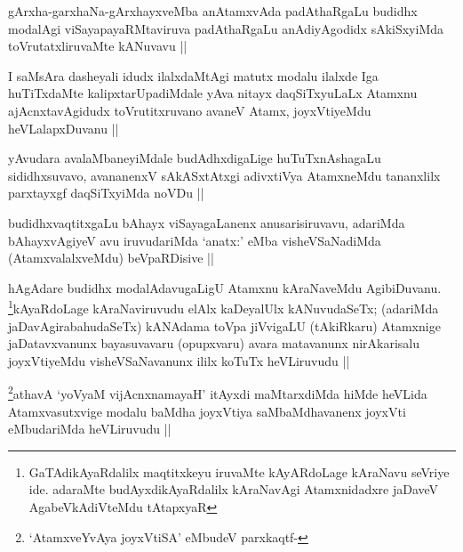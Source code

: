 \begin{artha}
gArxha-garxhaNa-gArxhayxveMba anAtamxvAda padAthaRgaLu budidhx modalAgi viSayapayaRMtaviruva padAthaRgaLu anAdiyAgodidx sAkiSxyiMda toVrutatxliruvaMte kANuvavu ||
\end{artha}

\begin{artha}
I saMsAra dasheyali idudx ilalxdaMtAgi matutx modalu ilalxde Iga huTiTxdaMte kalipxtarUpadiMdale yAva nitayx daqSiTxyuLaLx Atamxnu ajAcnxtavAgidudx toVrutitxruvano avaneV Atamx, joyxVtiyeMdu heVLalapxDuvanu ||
\end{artha}

\begin{artha}
yAvudara avalaMbaneyiMdale budAdhxdigaLige huTuTxnAshagaLu sididhxsuvavo, avananenxV sAkASxtAtxgi adivxtiVya AtamxneMdu tananxlilx parxtayxgf daqSiTxyiMda noVDu ||
\end{artha}

\begin{artha}
budidhxvaqtitxgaLu bAhayx viSayagaLanenx anusarisiruvavu, adariMda bAhayxvAgiyeV avu iruvudariMda `anatx:' eMba visheVSaNadiMda (AtamxvalalxveMdu) beVpaRDisive ||
\end{artha}

\begin{artha}
hAgAdare budidhx modalAdavugaLigU Atamxnu kAraNaveMdu AgibiDuvanu. \footnote{GaTAdikAyaRdalilx maqtitxkeyu iruvaMte kAyARdoLage kAraNavu seVriye ide. adaraMte budAyxdikAyaRdalilx kAraNavAgi Atamxnidadxre jaDaveV AgabeVkAdiVteMdu tAtapxyaR}kAyaRdoLage kAraNaviruvudu elAlx kaDeyalUlx kANuvudaSeTx; (adariMda jaDavAgirabahudaSeTx) kANAdama toVpa jiVvigaLU (tAkiRkaru) Atamxnige jaDatavxvanunx bayasuvavaru (opupxvaru) avara matavanunx nirAkarisalu joyxVtiyeMdu visheVSaNavanunx ililx koTuTx heVLiruvudu ||
\end{artha}

\begin{artha}
\footnote{`AtamxveYvAya joyxVtiSA' eMbudeV parxkaqtf-}athavA `yoV\s yaM vijAcnxnamayaH' itAyxdi maMtarxdiMda hiMde heVLida Atamxvasutxvige modalu baMdha joyxVtiya saMbaMdhavanenx joyxVti eMbudariMda heVLiruvudu ||
\end{artha}

